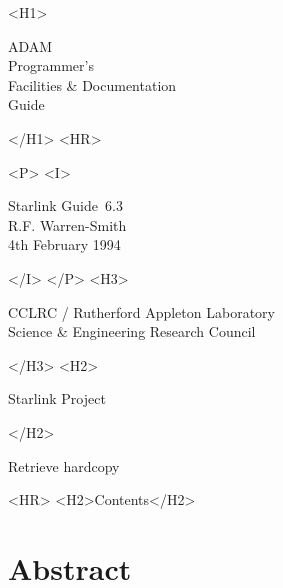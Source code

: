 \documentclass[twoside,11pt]{article}
\newcommand{\stardoccategory}  {Starlink Guide}
\newcommand{\stardocnumber}    {6.3}
\newcommand{\stardocauthors}   {R.F. Warren-Smith}
\newcommand{\stardocdate}      {4th February 1994}
\newcommand{\stardoctitle}     {ADAM\\[0.75ex]
                                Programmer's\\
                                Facilities \& Documentation\\
                                Guide}
\newcommand{\htmladdnormallink}[2]{#1}
\newcommand{\htmladdimg}[1]{}
\newcommand{\htmlref}[2]{#1}
\newcommand{\htmladdtonavigation}[1]{}
\newcommand{\xlabel}[1]{}
\newcommand{\latexonlytoc}[0]{\tableofcontents}
\begin{document}
\begin{htmlonly}
   \xlabel{}
   \begin{rawhtml} <H1> \end{rawhtml}
      \stardoctitle
   \begin{rawhtml} </H1> <HR> \end{rawhtml}


   \begin{rawhtml} <P> <I> \end{rawhtml}
   \stardoccategory\ \stardocnumber \\
   \stardocauthors \\
   \stardocdate
   \begin{rawhtml} </I> </P> <H3> \end{rawhtml}
      \htmladdnormallink{CCLRC}{http://www.cclrc.ac.uk} /
      \htmladdnormallink{Rutherford Appleton Laboratory}
                        {http://www.cclrc.ac.uk/ral} \\
      \htmladdnormallink{Science \& Engineering Research Council}
                        {http://www.stfc.ac.uk} \\
   \begin{rawhtml} </H3> <H2> \end{rawhtml}
      \htmladdnormallink{Starlink Project}{http://www.starlink.ac.uk/}
   \begin{rawhtml} </H2> \end{rawhtml}
   \htmladdnormallink{\htmladdimg{source.gif} Retrieve hardcopy}
      {http://www.starlink.ac.uk/cgi-bin/hcserver?\stardocsource}\\

  \label{stardoccontents}
  \begin{rawhtml}
    <HR>
    <H2>Contents</H2>
  \end{rawhtml}
  \newcommand{\latexonlytoc}[0]{}
  \htmladdtonavigation{\htmlref{\htmladdimg{contents_motif.gif}}
        {stardoccontents}}

  \section{\xlabel{abstract}Abstract}
\end{htmlonly}
\end{document}
